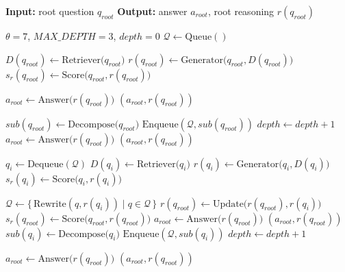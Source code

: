\documentclass[11pt]{article}
\begin{document}
\begin{algorithm}[H]
\caption{\textbf{D$^{2}$F-ReAG}}
\label{alg:aqd}
\begin{algorithmic}
\Statex \textbf{Input:} root question $q_{root}$
\Statex \textbf{Output:} answer $a_{root}$, root reasoning $r(q_{root})$

\State $\theta = 7$, $\mathit{MAX\_DEPTH} = 3$, $\mathit{depth} = 0$
\State $\mathcal{Q} \leftarrow \mathrm{Queue}()$

\State $D(q_{root}) \leftarrow \mathrm{Retriever}\bigl(q_{root}\bigr)$
\State $r(q_{root}) \leftarrow \mathrm{Generator}\bigl(q_{root}, D(q_{root})\bigr)$
\State $s_r(q_{root}) \leftarrow \mathrm{Score}\bigl(q_{root}, r(q_{root})\bigr)$

    \State $a_{root} \leftarrow \mathrm{Answer}\bigl(r(q_{root})\bigr)$
    \State \Return $(a_{root}, r(q_{root}))$
\EndIf

    \State $sub(q_{root}) \leftarrow \mathrm{Decompose}\bigl(q_{root}\bigr)$
    \State $\mathrm{Enqueue}(\mathcal{Q}, sub(q_{root}))$ 
    \State $\mathit{depth} \leftarrow \mathit{depth} + 1$
\Else
    \State $a_{root} \leftarrow \mathrm{Answer}\bigl(r(q_{root})\bigr)$
    \State \Return $(a_{root}, r(q_{root}))$
\EndIf

    \State $q_i \leftarrow \mathrm{Dequeue}(\mathcal{Q})$
    \State $D(q_i) \leftarrow \mathrm{Retriever}\bigl(q_i\bigr)$
    \State $r(q_i) \leftarrow \mathrm{Generator}\bigl(q_i, D(q_i)\bigr)$
    \State $s_r(q_i) \leftarrow \mathrm{Score}\bigl(q_i, r(q_i)\bigr)$

        \State $\mathcal{Q} \leftarrow \{\, \mathrm{Rewrite}(q, r(q_i)) \mid q \in \mathcal{Q} \,\}$
        \State $r(q_{root}) \leftarrow \mathrm{Update}\bigl(r(q_{root}), r(q_i)\bigr)$
        \State $s_r(q_{root}) \leftarrow \mathrm{Score}\bigl(q_{root}, r(q_{root})\bigr)$
            \State $a_{root} \leftarrow \mathrm{Answer}\bigl(r(q_{root})\bigr)$
            \State \Return $(a_{root}, r(q_{root}))$
        \EndIf
    \Else
            \State $sub(q_i) \leftarrow \mathrm{Decompose}\bigl(q_i\bigr)$
            \State $\mathrm{Enqueue}(\mathcal{Q}, sub(q_i))$ 
            \State $\mathit{depth} \leftarrow \mathit{depth} + 1$
        \EndIf
    \EndIf
\EndWhile

\State $a_{root} \leftarrow \mathrm{Answer}\bigl(r(q_{root})\bigr)$
\State \Return $(a_{root}, r(q_{root}))$
\end{algorithmic}
\end{algorithm}
\end{document}
